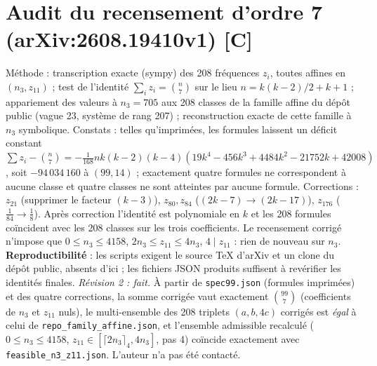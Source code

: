\documentclass[11pt,a4paper]{article}
\theoremstyle{definition}
\theoremstyle{remark}
\newcommand{\st}[1]{\textbf{[#1]}}
\newcommand{\code}[1]{\texttt{#1}}
\begin{document}
\section{Audit du recensement d'ordre 7 (arXiv:2608.19410v1) \st{C}}\label{sec:audit}
Méthode : transcription exacte (sympy) des 208 fréquences $z_i$, toutes affines en $(n_3,z_{11})$ ; test de l'identité $\sum_iz_i=\binom n7$ sur le lieu $n=k(k-2)/2+k+1$ ; appariement des valeurs à $n_3=705$ aux 208 classes de la famille affine du dépôt public (vague 23, système de rang 207) ; reconstruction exacte de cette famille à $n_3$ symbolique.
Constats : telles qu'imprimées, les formules laissent un déficit constant $\sum z_i-\binom n7=-\tfrac1{168}nk(k-2)(k-4)(19k^4-456k^3+4484k^2-21752k+42008)$, soit $-94\,034\,160$ à $(99,14)$ ; exactement quatre formules ne correspondent à aucune classe et quatre classes ne sont atteintes par aucune formule. Corrections : $z_{21}$ (supprimer le facteur $(k-3)$), $z_{80},z_{84}$ ($(2k-7)\to(2k-17)$), $z_{176}$ ($\tfrac1{84}\to\tfrac18$). Après correction l'identité est polynomiale en $k$ et les 208 formules coïncident avec les 208 classes sur les trois coefficients. Le recensement corrigé n'impose que $0\le n_3\le4158$, $2n_3\le z_{11}\le4n_3$, $4\mid z_{11}$ : rien de nouveau sur $n_3$.
\textbf{Reproductibilité} : les scripts exigent le source \TeX{} d'arXiv et un clone du dépôt public, absents d'ici ; les fichiers JSON produits suffisent à revérifier les identités finales. \emph{Révision 2 : fait.} À partir de \code{spec99.json} (formules imprimées) et des quatre corrections, la somme corrigée vaut exactement $\binom{99}{7}$ (coefficients de $n_3$ et $z_{11}$ nuls), le multi-ensemble des 208 triplets $(a,b,4c)$ corrigés est \emph{égal} à celui de \code{repo\_family\_affine.json}, et l'ensemble admissible recalculé ($0\le n_3\le4158$, $z_{11}\in[\lceil 2n_3\rceil_4,4n_3]$, pas 4) coïncide exactement avec \code{feasible\_n3\_z11.json}. L'auteur n'a pas été contacté.
\end{document}
